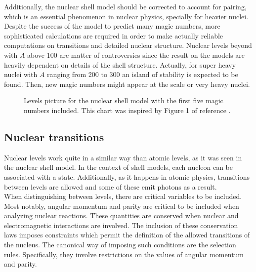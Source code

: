 \documentclass[openany]{book}
\begin{document}
Additionally, the nuclear shell model should be corrected to account for pairing, which is an essential phenomenon in nuclear physics, specially for heavier nuclei. Despite the success of the model to predict many magic numbers, more sophisticated calculations are required in order to make actually reliable computations on transitions and detailed nuclear structure. Nuclear levels beyond with $A$ above 100 are matter of controversies since the result on the models are heavily dependent on details of the shell structure. Actually, for super heavy nuclei with $A$ ranging from 200 to 300 an island of stability is expected to be found. Then, new magic numbers might appear at the scale or very heavy nuclei.  \\


\begin{figure}[H]
	
	\caption[Nuclear shell model levels picture]{Levels picture for the nuclear shell model with the first five magic numbers included. This chart was inspired by Figure 1 of reference \cite{tran_ong_hagen_morris_aoi_suzuki_kanada-enyo_geng_terashima_tanihata_2018}. }
	\label{fig:nuclerShellModelLevels}
\end{figure}


\subsection{Nuclear transitions}  \label{sub:nuclearTransitions}

Nuclear levels work quite in a similar way than atomic levels, as it was seen in the nuclear shell model. In the context of shell models, each nucleon can be associated with a state.  Additionally, as it happens in atomic physics, transitions between levels are allowed and some of these emit photons as a result. \\

When distinguishing between levels, there are critical variables to be included. Most notably, angular momentum and parity are critical to be included when analyzing nuclear reactions. These quantities are conserved when nuclear and electromagnetic interactions are involved. The inclusion of these conservation laws imposes constraints which permit the definition of the allowed transitions of the nucleus. The canonical way of imposing such conditions are the selection rules. Specifically, they involve restrictions on the values of angular momentum and parity.  \\
\end{document}
